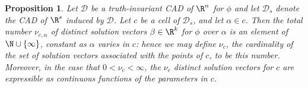 \documentclass{article}
\newtheorem{proposition}{Proposition}
\begin{document}
\begin{proposition} \label{Invariance of solution vector cardinality}
    Let $\mathcal{D}$ be a truth-invariant CAD of $\R^n$ 
    for $\phi$ and let $\mathcal{D}_s$ denote the CAD of $\R^s$ induced 
    by $\mathcal{D}$.
    Let $c$ be a cell of $\mathcal{D}_s$,
    and let $\alpha \in c$. Then the total number $\nu_{c, \alpha}$
    of distinct solution vectors $\beta \in \R^k$ for $\phi$
    over $\alpha$ is an element of 
    $\N \cup \{\infty\}$, constant as $\alpha$ varies in $c$:
    hence we may define $\nu_c$, the cardinality of the set of
    solution vectors associated with the points of $c$, to be this number.
    Moreover, in the case that $0 < \nu_c < \infty$, the $\nu_c$ distinct
    solution vectors for $c$ are expressible as continuous functions
    of the parameters in $c$.
\end{proposition}
\end{document}
